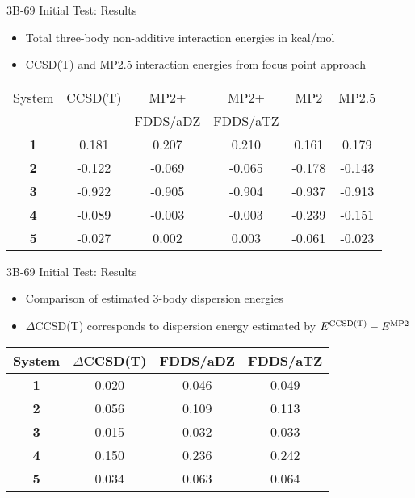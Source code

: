 \documentclass{beamer}
\begin{document}
        \begin{frame}{3B-69 Initial Test: Results}
            \begin{itemize}
                \item Total three-body non-additive interaction energies in kcal/mol
                \item CCSD(T) and MP2.5 interaction energies from focus point approach
            \end{itemize}
            \begin{table}
                \centering
                \begin{tabular}{c c c c c c}
                    \hline
                    System & CCSD(T) & MP2+ & MP2+ & MP2 & MP2.5 \\
                           & & FDDS/aDZ & FDDS/aTZ & & \\ \hline
                    \textbf{1} & 0.181 & 0.207 & 0.210 & 0.161 & 0.179 \\ 
                    \textbf{2} & -0.122 & -0.069 & -0.065 & -0.178 & -0.143 \\
                    \textbf{3} & -0.922 & -0.905 & -0.904 & -0.937 & -0.913 \\
                    \textbf{4} & -0.089 & -0.003 & -0.003 & -0.239 & -0.151 \\
                    \textbf{5} & -0.027 & 0.002 & 0.003 & -0.061 & -0.023 \\ \hline
                \end{tabular}
            \end{table}
        \end{frame}
        
        \begin{frame}{3B-69 Initial Test: Results}
            \begin{itemize}
                \item Comparison of estimated 3-body dispersion energies 
                \item $\Delta$CCSD(T) corresponds to dispersion energy estimated by $E^{\rm{CCSD(T)}} - E^{\rm{MP2}}$
            \end{itemize}
            \begin{table}
                \centering
                \begin{tabular}{c c c c}
                    \hline
                    System & $\Delta$CCSD(T) & FDDS/aDZ & FDDS/aTZ \\ \hline
                    \textbf{1} & 0.020 & 0.046 & 0.049 \\ 
                    \textbf{2} & 0.056 & 0.109 & 0.113 \\
                    \textbf{3} & 0.015 & 0.032 & 0.033 \\
                    \textbf{4} & 0.150 & 0.236 & 0.242 \\
                    \textbf{5} & 0.034 & 0.063 & 0.064 \\ \hline
                \end{tabular}
            \end{table}
        \end{frame}
\end{document}
